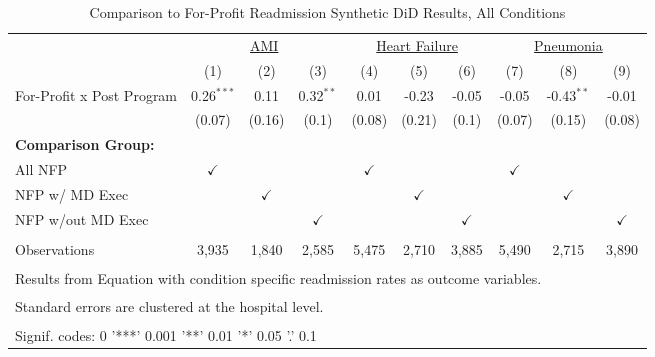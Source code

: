 \begin{table}[ht!]

\caption{\label{tab:fp_read_condition_synth}Comparison to For-Profit Readmission Synthetic DiD Results, All Conditions}
\centering
\begin{tabular}[t]{lccccccccc}
\toprule
\multicolumn{1}{c}{\underline{ }} & \multicolumn{3}{c}{\underline{AMI}} & \multicolumn{3}{c}{\underline{Heart Failure}} & \multicolumn{3}{c}{\underline{Pneumonia}} \\
 & (1) & (2) & (3) & (4) & (5) & (6) & (7) & (8) & (9)\\
\midrule
For-Profit x Post Program & 0.26$^{***}$ & 0.11 & 0.32$^{**}$ & 0.01 & -0.23 & -0.05 & -0.05 & -0.43$^{**}$ & -0.01\\
 & (0.07) & (0.16) & (0.1) & (0.08) & (0.21) & (0.1) & (0.07) & (0.15) & (0.08)\\
\textbf{Comparison Group:} &  &  &  &  &  &  &  &  & \\
All NFP & $\checkmark$ &  &  & $\checkmark$ &  &  & $\checkmark$ &  & \\
NFP w/ MD Exec &  & $\checkmark$ &  &  & $\checkmark$ &  &  & $\checkmark$ & \\
\addlinespace
NFP w/out MD Exec &  &  & $\checkmark$ &  &  & $\checkmark$ &  &  & $\checkmark$\\
 &  &  &  &  &  &  &  &  & \\
Observations & 3,935 & 1,840 & 2,585 & 5,475 & 2,710 & 3,885 & 5,490 & 2,715 & 3,890\\
\bottomrule
\multicolumn{10}{l}{\textsuperscript{} Results from Equation with condition specific readmission rates as outcome variables.}\\
\multicolumn{10}{l}{\textsuperscript{} Standard errors are clustered at the hospital level.}\\
\multicolumn{10}{l}{\textsuperscript{} Signif. codes: 0 '***' 0.001 '**' 0.01 '*' 0.05 '.' 0.1}\\
\end{tabular}
\end{table}
